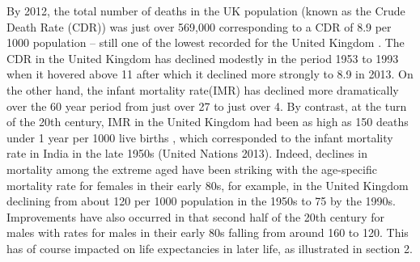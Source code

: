 \documentclass[11 pt, a4paper]{report}
\begin{document}
By 2012, the total number of deaths in the UK population (known as the Crude Death Rate (CDR)) was just over 569,000 corresponding to a CDR of 8.9 per 1000 population – still one of the lowest recorded for the United Kingdom \citep{ONS2014}. The CDR in the United Kingdom has declined modestly in the period 1953 to 1993 when it hovered above 11 after which it declined more strongly to 8.9 in 2013. On the other hand, the infant mortality rate(IMR) has declined more dramatically over the 60 year period from just over 27 to just over 4.  By contrast, at the turn of the 20th century, IMR in the United Kingdom had been as high as 150 deaths under 1 year per 1000 live births \citep{ONS2014}, which corresponded to the infant mortality rate in India in the late 1950s (United Nations 2013). Indeed, declines in mortality among the extreme aged have been striking with the age-specific mortality rate for females in their early 80s, for example, in the United Kingdom declining from about 120 per 1000 population in the 1950s to 75 by the 1990s. Improvements have also occurred in that second half of the 20th century for males with rates for males in their early 80s falling from around 160 to 120. This has of course impacted on life expectancies in later life, as illustrated in section 2.
\end{document}
